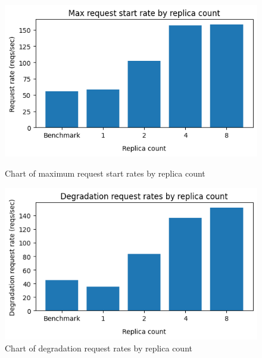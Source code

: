 \begin{figure}[h]
    \centering
    \begin{minipage}{.45\textwidth}
      \centering
      \includegraphics[width=\linewidth]{figures/uor-replica-count-breakpoint-max-reqs.png}

      \caption{Chart of maximum request start rates by replica count}
      \label{figure:uor-replica-count-breakpoint-max-reqs}
    \end{minipage}%
    \hspace{0.09\textwidth} %
    \begin{minipage}{.45\textwidth}
      \centering
      \includegraphics[width=\linewidth]{figures/uor-replica-count-breakpoint-deg-rates.png}

      \caption{Chart of degradation request rates by replica count}
      \label{figure:uor-replica-count-breakpoint-deg-rates}
    \end{minipage}
\end{figure}

